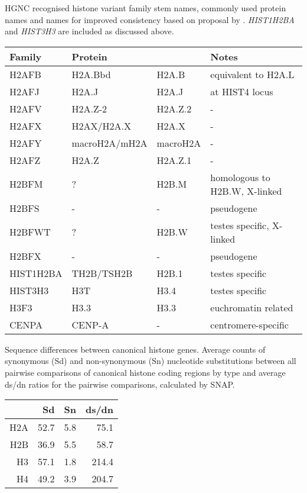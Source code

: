   \newpage
  \begin{supplement}
    \caption{HGNC recognised histone variant family stem names, commonly used protein names
             and names for improved consistency based on proposal by \citet{Talbert2012}.
             \textit{HIST1H2BA} and \textit{HIST3H3} are included as discussed above.}
    \label{tab:histone-variant-families}
    \centering
    \begin{tabular}{l l l l}
      \toprule
      Family & Protein & \citet{Talbert2012} & Notes \\
      \midrule
      H2AFB & H2A.Bbd & H2A.B & equivalent to H2A.L \\
      H2AFJ & H2A.J & H2A.J & at HIST4 locus \\
      H2AFV & H2A.Z-2 & H2A.Z.2 & - \\
      H2AFX & H2AX/H2A.X & H2A.X & - \\
      H2AFY & macroH2A/mH2A & macroH2A & - \\
      H2AFZ & H2A.Z & H2A.Z.1 & - \\
      H2BFM & ? & H2B.M & homologous to H2B.W, X-linked\\
      H2BFS & - & - & pseudogene \\
      H2BFWT & ? & H2B.W & testes specific, X-linked \\
      H2BFX & - & - & pseudogene \\
      HIST1H2BA & TH2B/TSH2B & H2B.1 & testes specific \\
      HIST3H3 & H3T & H3.4 & testes specific \\
      H3F3 & H3.3 & H3.3 & euchromatin related \\
      CENPA & CENP-A & - & centromere-specific \\
      \bottomrule
    \end{tabular}
  \end{supplement}

  \newpage
  \begin{supplement}
    \caption{Sequence differences between canonical histone genes.
             Average counts of synonymous (Sd) and non-synonymous (Sn) nucleotide substitutions
             between all pairwise comparisons of canonical histone coding regions by type
             and average ds/dn ratios for the pairwise comparisons,
             calculated by SNAP.}
    \label{tab:histone-gene-differences}
    \centering
    \begin{tabular}{r r r r}
      \toprule
      \null & Sd & Sn & ds/dn \\
      \midrule
      H2A & 52.7 & 5.8 & 75.1 \\
      H2B & 36.9 & 5.5 & 58.7 \\
      H3 & 57.1 & 1.8 & 214.4 \\
      H4 & 49.2 & 3.9 & 204.7 \\
      \bottomrule
    \end{tabular}
  \end{supplement}

